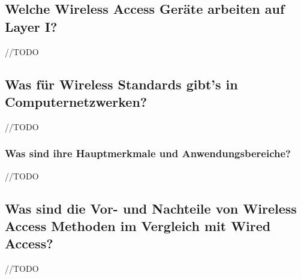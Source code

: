 \subsection*{Welche Wireless Access Geräte arbeiten auf Layer I?}
//TODO
\subsection*{Was für Wireless Standards gibt’s in Computernetzwerken?}
//TODO
\subsubsection*{Was sind ihre Hauptmerkmale und Anwendungsbereiche?}
//TODO
\subsection*{Was sind die Vor- und Nachteile von \flqq{}Wireless Access\frqq{} Methoden im Vergleich mit \flqq{}Wired Access\frqq?}
//TODO